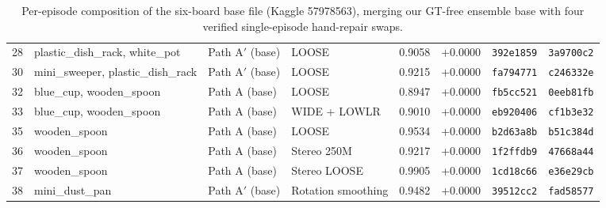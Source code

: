 \documentclass[10pt]{nvidiaextabstract}
\begin{document}
\begin{table}[t]
{\begin{tabular}{@{}rlllrrll@{}}
    28 & plastic\_dish\_rack, white\_pot   & Path A$'$ (base) & LOOSE                & 0.9058 & +0.0000 & \texttt{392e1859} & \texttt{3a9700c2} \\
    30 & mini\_sweeper, plastic\_dish\_rack& Path A$'$ (base) & LOOSE                & 0.9215 & +0.0000 & \texttt{fa794771} & \texttt{c246332e} \\
    32 & blue\_cup, wooden\_spoon          & Path A (base)    & LOOSE                & 0.8947 & +0.0000 & \texttt{fb5cc521} & \texttt{0eeb81fb} \\
    33 & blue\_cup, wooden\_spoon          & Path A (base)    & WIDE + LOWLR         & 0.9010 & +0.0000 & \texttt{eb920406} & \texttt{cf1b3e32} \\
    35 & wooden\_spoon                     & Path A (base)    & LOOSE                & 0.9534 & +0.0000 & \texttt{b2d63a8b} & \texttt{b51c384d} \\
    36 & wooden\_spoon                     & Path A (base)    & Stereo 250M          & 0.9217 & +0.0000 & \texttt{1f2ffdb9} & \texttt{47668a44} \\
    37 & wooden\_spoon                     & Path A (base)    & Stereo LOOSE         & 0.9905 & +0.0000 & \texttt{1cd18c66} & \texttt{e36e29cb} \\
    38 & mini\_dust\_pan                   & Path A$'$ (base) & Rotation smoothing   & 0.9482 & +0.0000 & \texttt{39512cc2} & \texttt{fad58577} \\
    \bottomrule
  \end{tabular}}
  \caption{Per-episode composition of the six-board base file (Kaggle 57978563), merging our GT-free ensemble base with four verified single-episode hand-repair swaps.}
  \label{tab:provenance}
\end{table}
\end{document}
